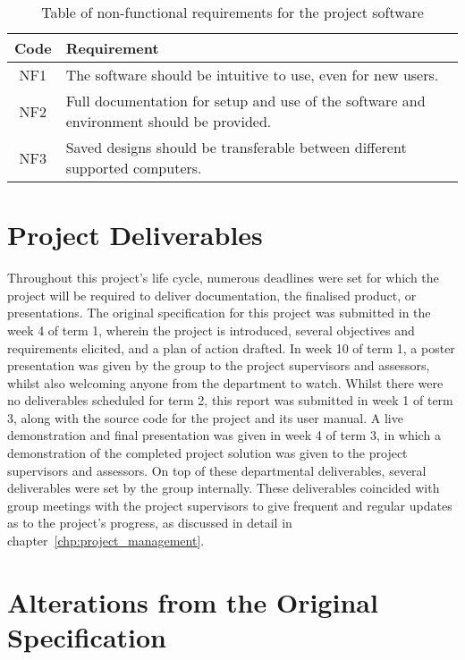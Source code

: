         \begin{center}
            \begin{longtable}{ | c | p{} | }
                \caption{Table of non-functional requirements for the project software}\label{tab:nonfun_requirements}\\%
                \hline Code & Requirement\\ \hline
                NF1 & The software should be intuitive to use, even for new users. \\  \hline
                NF2 & Full documentation for setup and use of the software and environment should be provided. \\\hline
                NF3 & Saved designs should be transferable between different supported computers. \\\hline
        \end{longtable}
    \end{center}

\section{Project Deliverables}
    
    Throughout this project's life cycle, numerous deadlines were set for which the project will be required to deliver documentation, the finalised product, or presentations. The original specification for this project was submitted in the week 4 of term 1, wherein the project is introduced, several objectives and requirements elicited, and a plan of action drafted. In week 10 of term 1, a poster presentation was given by the group to the project supervisors and assessors, whilst also welcoming anyone from the department to watch. Whilst there were no deliverables scheduled for term 2, this report was submitted in week 1 of term 3, along with the source code for the project and its user manual. A live demonstration and final presentation was given in week 4 of term 3, in which a demonstration of the completed project solution was given to the project supervisors and assessors. On top of these departmental deliverables, several deliverables were set by the group internally. These deliverables coincided with group meetings with the project supervisors to give frequent and regular updates as to the project's progress, as discussed in detail in chapter~\ref{chp:project_management}.

\section{Alterations from the Original Specification}

